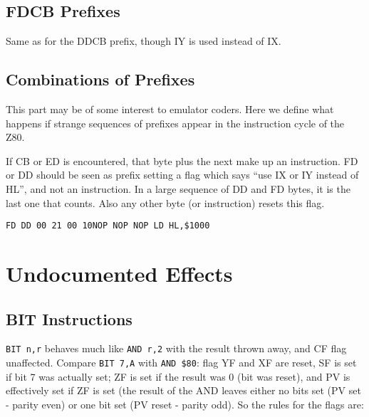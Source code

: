 \documentclass[12pt,twoside,openright,a4paper]{book}
\begin{document}
\pagebreak
\subsection{FDCB Prefixes}

Same as for the DDCB prefix, though IY is used instead of IX.


\subsection{Combinations of Prefixes}

This part may be of some interest to emulator coders. Here we define what happens if strange sequences of prefixes appear in the instruction cycle of the Z80.

If CB or ED is encountered, that byte plus the next make up an instruction. FD or DD should be seen as prefix setting a flag which says ``use IX or IY instead of HL'', and not an instruction. In a large sequence of DD and FD bytes, it is the last one that counts. Also any other byte (or instruction) resets this flag.

{\tt {\qquad}FD DD 00 21 00 10{\qquad}NOP NOP NOP LD HL,\$1000}




\section{Undocumented Effects}

\subsection{BIT Instructions}
\label{bit_flags}

{\tt BIT n,r} behaves much like {\tt AND r,2{\raisebox{1ex}{n}}} with the result thrown away, and CF flag unaffected. Compare {\tt BIT 7,A} with {\tt AND \$80}: flag YF and XF are reset, SF is set if bit 7 was actually set; ZF is set if the result was 0 (bit was reset), and PV is effectively set if ZF is set (the result of the AND leaves either no bits set (PV set - parity even) or one bit set (PV reset - parity odd). So the rules for the flags are:
\end{document}
